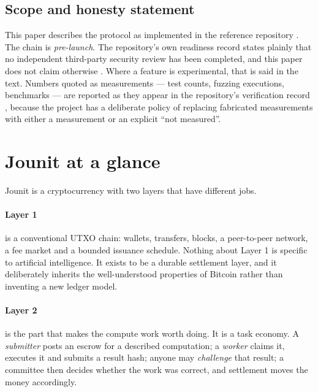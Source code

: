 \documentclass{article}
\begin{document}
\subsection{Scope and honesty statement}

This paper describes the protocol as implemented in the reference repository
\cite{jounit-repo,jounit-spec}. The chain is \emph{pre-launch}. The repository's
own readiness record states plainly that no independent third-party security
review has been completed, and this paper does not claim otherwise
\cite{jounit-readiness}. Where a feature is experimental, that is said in the
text. Numbers quoted as measurements --- test counts, fuzzing executions,
benchmarks --- are reported as they appear in the repository's verification
record \cite{jounit-status,jounit-fuzz}, because the project has a deliberate
policy of replacing fabricated measurements with either a measurement or an
explicit ``not measured''.


\section{Jounit at a glance}
\label{sec:glance}

Jounit is a cryptocurrency with two layers that have different jobs.

\paragraph{Layer 1} is a conventional UTXO chain: wallets, transfers, blocks,
a peer-to-peer network, a fee market and a bounded issuance schedule. Nothing
about Layer 1 is specific to artificial intelligence. It exists to be a durable
settlement layer, and it deliberately inherits the well-understood properties
of Bitcoin \cite{nakamoto2008bitcoin,antonopoulos2017mastering} rather than
inventing a new ledger model.

\paragraph{Layer 2} is the part that makes the compute work worth doing. It is a
task economy. A \emph{submitter} posts an escrow for a described computation; a
\emph{worker} claims it, executes it and submits a result hash; anyone may
\emph{challenge} that result; a committee then decides whether the work was
correct, and settlement moves the money accordingly.
\end{document}

